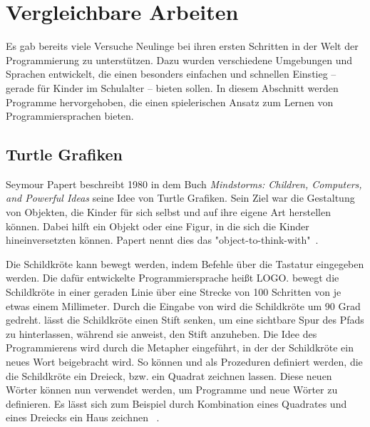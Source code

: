 \chapter{Vergleichbare Arbeiten}
\label{sec:related}

Es gab bereits viele Versuche Neulinge bei ihren ersten Schritten in der Welt der Programmierung zu unterstützen. Dazu wurden verschiedene Umgebungen und Sprachen entwickelt, die einen besonders einfachen und schnellen Einstieg -- gerade für Kinder im Schulalter -- bieten sollen. In diesem Abschnitt werden Programme hervorgehoben, die einen spielerischen Ansatz zum Lernen von Programmiersprachen bieten.

\section{Turtle Grafiken}
\label{sec:related:turtle}

Seymour Papert beschreibt 1980 in dem Buch \textit{Mindstorms: Children, Computers, and Powerful Ideas} seine Idee von Turtle Grafiken. Sein Ziel war die Gestaltung von Objekten, die Kinder für sich selbst und auf ihre eigene Art herstellen können. Dabei hilft ein Objekt oder eine Figur, in die sich die Kinder hineinversetzten können. Papert nennt dies das "object-to-think-with"~\cite[11]{papert1980}.

Die Schildkröte kann bewegt werden, indem Befehle über die Tastatur eingegeben werden. Die dafür entwickelte Programmiersprache heißt LOGO.  bewegt die Schildkröte in einer geraden Linie über eine Strecke von 100 Schritten von je etwas einem Millimeter. Durch die Eingabe von  wird die Schildkröte um 90 Grad gedreht.  lässt die Schildkröte einen Stift senken, um eine sichtbare Spur des Pfads zu hinterlassen, während  sie anweist, den Stift anzuheben. Die Idee des Programmierens wird durch die Metapher eingeführt, in der der Schildkröte ein neues Wort beigebracht wird. So können   und   als Prozeduren definiert werden, die die Schildkröte ein Dreieck, bzw. ein Quadrat zeichnen lassen. Diese neuen Wörter können nun verwendet werden, um Programme und neue Wörter zu definieren. Es lässt sich zum Beispiel durch Kombination eines Quadrates und eines Dreiecks ein Haus zeichnen ~\cite[12]{papert1980}.

